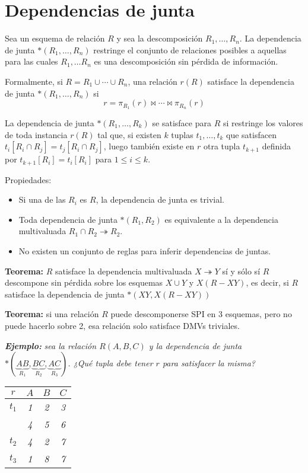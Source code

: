 \documentclass[a4paper, twoside]{article}
\begin{document}
\section{Dependencias de junta}
Sea un esquema de relación $R$ y sea la descomposición $R_{1},\ldots,R_{n}$. La dependencia de junta $*\left(R_{1},\ldots,R_{n}\right)$ restringe el conjunto de relaciones posibles a aquellas para las cuales $R_{1},\ldots R_{n}$ es una descomposición sin pérdida de información.

Formalmente, si $R=R_{1}\cup\cdots\cup R_{n}$, una relación $r(R)$ satisface la dependencia de junta $*\left(R_{1},\ldots,R_{n}\right)$ si 
\[
	r=\pi_{R_{1}}(r)\bowtie\cdots\bowtie\pi_{R_{n}}(r)
\]

La dependencia de junta $*\left(R_{1},\ldots,R_{k}\right)$ se satisface para $R$ si restringe los valores de toda instancia $r(R)$ tal que, si existen $k$ tuplas $t_{1},\ldots,t_{k}$ que satisfacen $t_{i}\left[R_{i}\cap R_{j}\right]=t_{j}\left[R_{i}\cap R_{j}\right]$, luego también existe en $r$ otra tupla $t_{k+1}$ definida por $t_{k+1}\left[R_{i}\right]=t_{i}\left[R_{i}\right]$ para $1\leq i\leq k$.

Propiedades:
\begin{itemize}
	\item Si una de las $R_{i}$ es $R$, la dependencia de junta es trivial.
	\item Toda dependencia de junta $*(R_{1},R_{2})$ es equivalente a la dependencia multivaluada $R_{1}\cap R_{2}\twoheadrightarrow R_{2}$.
	\item No existen un conjunto de reglas para inferir dependencias de juntas.
\end{itemize}

\textbf{Teorema:} $R$ satisface la dependencia multivaluada $X\twoheadrightarrow Y$ sí y sólo sí $R$ descompone sin pérdida sobre los esquemas $X\cup Y$ y $X(R-XY)$, es decir, si $R$ satisface la dependencia de junta
$*\left(XY,X(R-XY)\right)$

\textbf{Teorema:} si una relación $R$ puede descomponerse SPI en 3 esquemas, pero no puede hacerlo sobre 2, esa relación solo satisface DMVs triviales.

\textbf{\emph{Ejemplo:}} \emph{sea la relación $R(A,B,C)$ y la dependencia de junta $*\left(\underset{R_{1}}{\underbrace{AB}},\underset{R_{2}}{\underbrace{BC}},\underset{R_{3}}{\underbrace{AC}}\right)$. ¿Qué tupla debe tener $r$ para satisfacer la misma?}

\begin{center}
	\begin{tabular}{|c|c|c|c|}
		\hline 
		$r$ & \emph{$A$} & \emph{$B$} & \emph{$C$}\\
		\hline 
		\hline 
		\emph{$t_{1}$} & \emph{1} & \emph{2} & \emph{3}\\
		\hline 
		 & \emph{4} & \emph{5} & \emph{6}\\
		\hline 
		\emph{$t_{2}$} & \emph{4} & \emph{2} & \emph{7}\\
		\hline 
		\emph{$t_{3}$} & \emph{1} & \emph{8} & \emph{7}\\
		\hline 
	\end{tabular}
\end{center}
\end{document}
